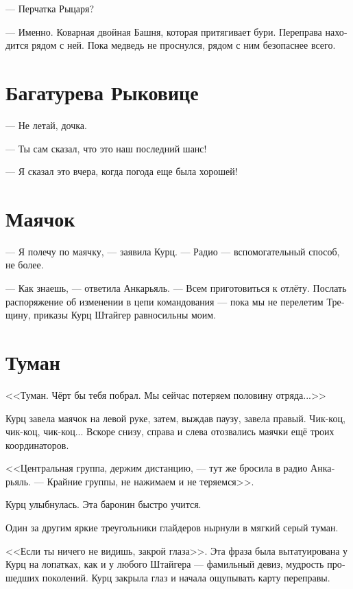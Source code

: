 \documentclass[a4paper,10pt,fleqn]{book}\usepackage{polyglossia}\setdefaultlanguage[babelshorthands=true]{russian}\setotherlanguage{english}\defaultfontfeatures{Ligatures=TeX,Mapping=tex-text}\usepackage{xcolor}\newcommand{\ml}[3]{#2}
\begin{document}
\ml{$0$}
{--- Перчатка Рыцаря?}
{``Knight's Mitten?''}

\ml{$0$}
{--- Именно.}
{``Exactly.}
\ml{$0$}
{Коварная двойная Башня, которая притягивает бури.}
{A treacherous double Tower, which attracts storms.}
Переправа находится рядом с ней.
Пока медведь не проснулся, рядом с ним безопаснее всего.

\section{Багатурева Рыковице}

--- Не летай, дочка.

--- Ты сам сказал, что это наш последний шанс!

--- Я сказал это вчера, когда погода еще была хорошей!

\section{Маячок}

--- Я полечу по маячку, --- заявила Курц.
--- Радио --- вспомогательный способ, не более.

--- Как знаешь, --- ответила Анкарьяль.
--- Всем приготовиться к отлёту.
Послать распоряжение об изменении в цепи командования --- пока мы не перелетим Трещину, приказы Курц Штайгер равносильны моим.

\section{Туман}

<<Туман.
Чёрт бы тебя побрал.
Мы сейчас потеряем половину отряда...>>

Курц завела маячок на левой руке, затем, выждав паузу, завела правый.
Чик-коц, чик-коц, чик-коц...
Вскоре снизу, справа и слева отозвались маячки ещё троих координаторов.

<<Центральная группа, держим дистанцию, --- тут же бросила в радио Анкарьяль.
--- Крайние группы, не нажимаем и не теряемся>>.

Курц улыбнулась.
Эта баронин быстро учится.

Один за другим яркие треугольники глайдеров нырнули в мягкий серый туман.

<<Если ты ничего не видишь, закрой глаза>>.
Эта фраза была вытатуирована у Курц на лопатках, как и у любого Штайгера --- фамильный девиз, мудрость прошедших поколений.
Курц закрыла глаз и начала ощупывать карту переправы.
\end{document}
